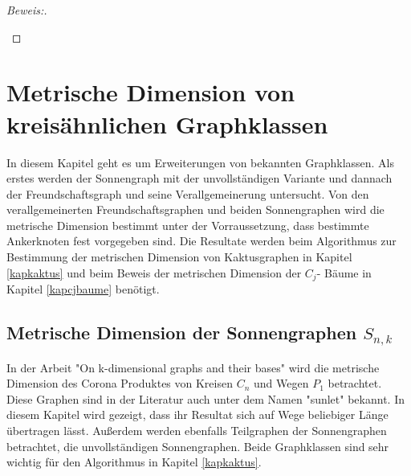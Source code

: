 \begin{proof}[Beweis:]
\begin{enumerate}
\begin{itemize}
\end{itemize}
\end{enumerate}
\end{proof}
\chapter{Metrische Dimension von kreisähnlichen Graphklassen}
\vspace{-5mm}
In diesem Kapitel geht es um Erweiterungen von bekannten Graphklassen. Als erstes werden der Sonnengraph mit der unvollständigen Variante und dannach der Freundschaftsgraph und seine Verallgemeinerung untersucht.
Von den verallgemeinerten Freundschaftsgraphen und beiden Sonnengraphen wird die metrische Dimension bestimmt unter der Vorraussetzung, dass bestimmte Ankerknoten fest vorgegeben sind. Die Resultate werden beim Algorithmus zur Bestimmung der metrischen Dimension von Kaktusgraphen in Kapitel \ref{kapkaktus} und beim Beweis der metrischen Dimension der $C_j$- Bäume in Kapitel \ref{kapcjbaume} benötigt.
\vspace{-6mm}
\section{Metrische Dimension der Sonnengraphen $S_{n,k}$}
\label{chap_sonne}
In der Arbeit "On k-dimensional graphs and their bases" \cite{bases} wird die metrische Dimension des Corona Produktes von Kreisen $C_n$ und Wegen $P_1$ betrachtet. Diese Graphen sind in der Literatur auch unter dem Namen "sunlet"\cite{sunwebsite} bekannt. In diesem Kapitel wird gezeigt, dass ihr Resultat sich auf Wege beliebiger Länge übertragen lässt. Außerdem werden ebenfalls Teilgraphen der Sonnengraphen betrachtet, die unvollständigen Sonnengraphen. Beide Graphklassen sind sehr wichtig für den Algorithmus in Kapitel \ref{kapkaktus}.

